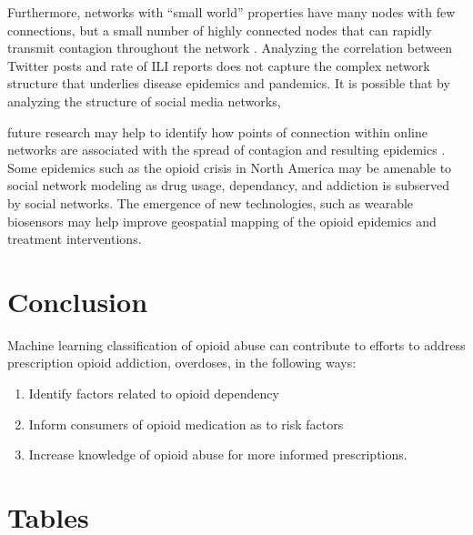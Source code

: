 \documentclass[sigconf]{acmart}
\begin{document}
Furthermore, networks with ``small world'' properties have many nodes with 
few connections, but a small number of highly connected nodes that can rapidly 
transmit contagion throughout the network \cite{watts98}. Analyzing the 
correlation between Twitter posts and rate of ILI reports does not capture the 
complex network structure that underlies disease epidemics and pandemics. 
It is possible that by analyzing the structure of social media networks, 

future research may help to identify how points of connection within online
networks are associated with the spread of contagion and resulting epidemics 
\cite{zhu17}. Some epidemics such as the opioid crisis in North America 
\cite{volkow14} may be amenable to social network modeling as drug usage, 
dependancy, and addiction is subserved by social networks. The emergence of 
new technologies, such as wearable biosensors \cite{carreiro15} may help 
improve geospatial mapping of the opioid epidemics and treatment interventions.

\section{Conclusion}

Machine learning classification of opioid abuse can contribute to efforts to address prescription opioid addiction, overdoses, in the following ways: 
\begin{enumerate}
\item Identify factors related to opioid dependency
\item Inform consumers of opioid medication as to risk factors 
\item Increase knowledge of opioid abuse for more informed prescriptions. 
\end{enumerate}



\section{Tables}

\end{document}
